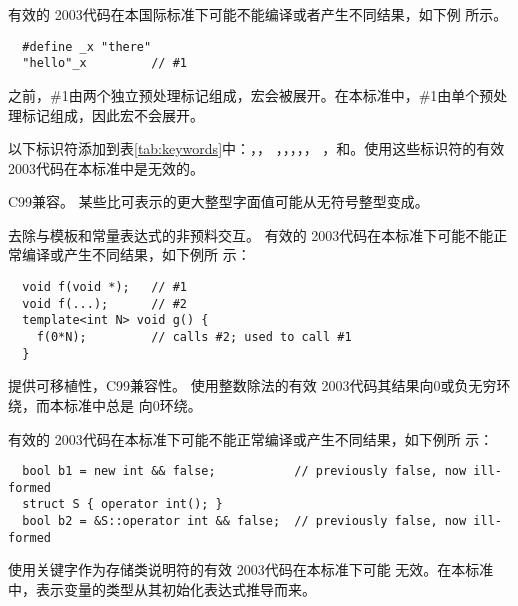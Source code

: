 \diffrat \featreq
\diffeff 有效的\cpp{} 2003代码在本国际标准下可能不能编译或者产生不同结果，如下例
所示。
\begin{lstlisting}
  #define _x "there"
  "hello"_x         // #1
\end{lstlisting}
之前，\#1由两个独立预处理标记组成，宏会被展开。在本标准中，\#1由单个预处
理标记组成，因此宏不会展开。

\diffrat \featreq
\diffeff 以下标识符添加到表\ref{tab:keywords}中：，，
，，，，，
，和。使用这些标识符的有效
\cpp{} 2003代码在本标准中是无效的。

\diffrat C99兼容。
\diffeff 某些比可表示的更大整型字面值可能从无符号整型变成。

\diffrat 去除与模板和常量表达式的非预料交互。
\diffeff 有效的\cpp{} 2003代码在本标准下可能不能正常编译或产生不同结果，如下例所
示：
\begin{lstlisting}
  void f(void *);   // #1
  void f(...);      // #2
  template<int N> void g() {
    f(0*N);         // calls #2; used to call #1
  }
\end{lstlisting}

\diffrat 提供可移植性，C99兼容性。
\diffeff 使用整数除法的有效\cpp{} 2003代码其结果向0或负无穷环绕，而本标准中总是
向0环绕。

\diffrat \featreq
\diffeff 有效的\cpp{} 2003代码在本标准下可能不能正常编译或产生不同结果，如下例所
示：
\begin{lstlisting}
  bool b1 = new int && false;           // previously false, now ill-formed
  struct S { operator int(); }
  bool b2 = &S::operator int && false;  // previously false, now ill-formed
\end{lstlisting}

\diffrat \newfeat
\diffeff 使用关键字作为存储类说明符的有效\cpp{} 2003代码在本标准下可能
无效。在本标准中，表示变量的类型从其初始化表达式推导而来。

